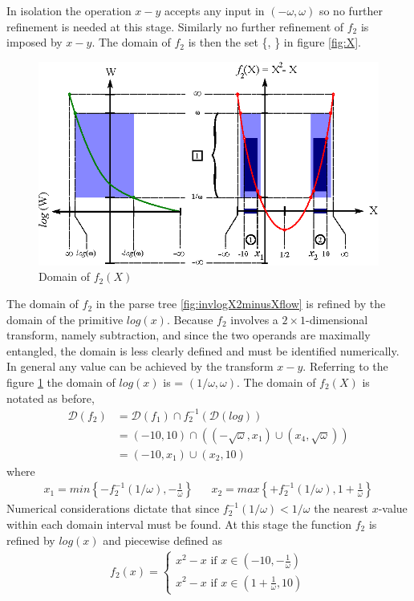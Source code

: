 In isolation the operation $x-y$ accepts any input in $(-\omega, \omega)$ so no further refinement is needed at this stage. Similarly no further refinement of $f_2$ is imposed by $x-y$. The domain of $f_2$ is then the set \{, \} in figure \ref{fig:X}.


\begin{figure}
  \centering
  \includegraphics{Images/X2minusX.eps}
  \caption[Domain of $f_2(X)$]
          {Domain of $f_2(X)$}
  \label{fig:X2minusX}
\end{figure}

The domain of $f_2$ in the parse tree \ref{fig:invlogX2minusXflow} is refined by the domain of the primitive $log(x)$. Because $f_2$ involves a $2\times1$-dimensional transform, namely subtraction, and since the two operands are maximally entangled, the domain is less clearly defined and must be identified numerically. In general any value can be achieved by the transform $x-y$. Referring to the figure \ref{fig:X2minusX} the domain of $log(x)$ is  = $(1/\omega, \omega)$. The domain of $f_2(X)$ is notated as before,
\begin{align*}
\mathcal{D}(f_2) &= \mathcal{D}(f_1) \cap f_2^{-1}(\mathcal{D}(log))\\
                    &= (-10,10) \cap \left((-\sqrt{\omega}, x_1) 
                                            \cup (x_4, \sqrt{\omega})\right)\\
                    &= (-10, x_1)  \cup (x_2, 10)
\end{align*}
where
\begin{align*}
x_1 = min \left\{ -f_2^{-1}(1/\omega),  -\frac{1}{\omega} \right\} && 
x_2 = max \left\{ +f_2^{-1}(1/\omega), 1+\frac{1}{\omega} \right\}
\end{align*}
Numerical considerations dictate that since $f_2^{-1}(1/\omega) < 1/\omega$ the nearest $x$-value within each domain interval must be found. At this stage the function $f_2$ is refined by $log(x)$ and piecewise defined as
\begin{align*}
f_2(x) = \begin{cases} x^2 - x \text{ if } x \in (-10, -\frac{1}{\omega})\\
                       x^2 - x \text{ if } x \in (1+\frac{1}{\omega}, 10)
         \end{cases}
\end{align*}

